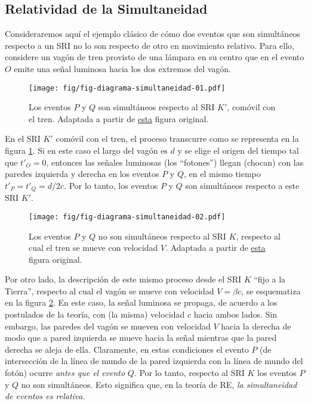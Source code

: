 \subsection{Relatividad de la Simultaneidad}
Consideraremos aquí el ejemplo clásico de cómo dos eventos que son simultáneos respecto a un SRI no lo son respecto de otro en movimiento relativo. Para ello, considere un vagón de tren provisto de una lámpara en su centro que en el evento $O$ emite una se\~nal luminosa hacia los dos extremos del vagón.
\begin{figure}[H]
\centerline{\texttt{[image: fig/fig-diagrama-simultaneidad-01.pdf]}}
\caption{Los eventos $P$ y $Q$ son simultáneos respecto al SRI $K'$, comóvil con el tren. Adaptada a partir de \href{https://commons.wikimedia.org/wiki/File:Traincar_Relativity1.svg}{esta} figura original.}
\label{sim01}
\end{figure}
En el SRI $K'$ comóvil con el tren, el proceso transcurre como se representa en la figura \ref{sim01}. Si en este caso el largo del vagón es $d$ y se elige el origen del tiempo tal que $t'_O=0$, entonces las se\~nales luminosas (los ``fotones'') llegan (chocan) con las paredes izquierda y derecha en los eventos $P$ y $Q$, en el mismo tiempo $t'_P=t'_Q=d/2c$. Por lo tanto, los eventos $P$ y $Q$ son simultáneos respecto a este SRI $K'$.
\begin{figure}[H]
\centerline{\texttt{[image: fig/fig-diagrama-simultaneidad-02.pdf]}}
\caption{Los eventos $P$ y $Q$ no son simultáneos respecto al SRI $K$, respecto al cual el tren se mueve con velocidad $V$. Adaptada a partir de \href{https://commons.wikimedia.org/wiki/File:Traincar_Relativity2.svg}{esta} figura original.}
\label{sim02}
\end{figure}

Por otro lado, la descripción de este mismo proceso desde el SRI $K$ ``fijo a la Tierra'', respecto al cual el vagón se mueve con velocidad $V=\beta c$, se esquematiza en la figura \ref{sim02}. En este caso, la se\~nal luminosa se propaga, de acuerdo a los postulados de la teoría, con (la misma) velocidad $c$ hacia ambos lados. Sin embargo, las paredes del vagón se mueven con velocidad $V$ hacia la derecha de modo que a pared izquierda se mueve hacia la se\~nal mientras que la pared derecha se aleja de ella. Claramente, en estas condiciones el evento $P$ (de intersección de la línea de mundo de la pared izquierda con la línea de mundo del fotón) ocurre \textit{antes que el evento} $Q$. Por lo tanto, respecto al SRI $K$ los eventos $P$ y $Q$ no son simultáneos. Esto significa que, en la teoría de RE, \textit{la simultaneidad de eventos es relativa}.

